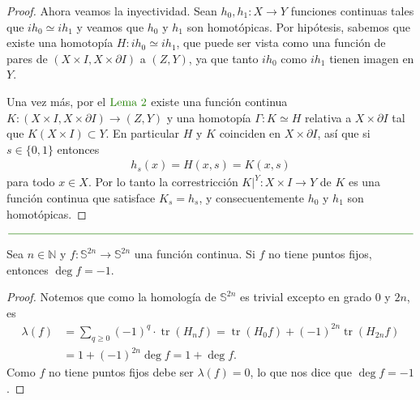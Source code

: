 \documentclass[11pt]{article}
\newcommand{\N}{\mathbb{N}}
\newcommand{\Ss}{\mathbb{S}}
\newcommand{\tr}{\operatorname{tr}}
\newcommand{\paint}[1]{\color{color}{#1}}
\newenvironment{lemma}[2][Lema]{\begin{trivlist}
\item[\hskip \labelsep \paint{{\bfseries #1}}\hskip \labelsep {\bfseries #2.}]}{\end{trivlist}}
\begin{document}
\begin{proof}
Ahora veamos la inyectividad. Sean $h_0,h_1 : X \to Y$ funciones continuas tales que $ih_0 \simeq ih_1$ y veamos que $h_0$ y $h_1$ son homotópicas. Por hipótesis, sabemos que existe una homotopía $H : ih_0 \simeq ih_1$, que puede ser vista como una función de pares de $(X \times I, X \times \partial I)$ a $(Z,Y)$, ya que tanto $ih_0$ como $ih_1$ tienen imagen en $Y$. 

Una vez más, por el $\paint{\text{Lema $2$}}$ existe una función continua $K : (X \times I, X \times \partial I) \to (Z,Y)$ y una homotopía $\Gamma : K \simeq H$ relativa a $X \times \partial I$ tal que $K(X \times I) \subset Y$. En particular $H$ y $K$ coinciden en $X \times \partial I$, así que si $s \in \{0,1\}$ entonces
\begin{align*}
h_s(x) = H(x,s) = K(x,s)
\end{align*}
para todo $x \in X$. Por lo tanto la correstricción $K|^Y : X \times I \to Y$ de $K$ es una función continua que satisface $K_s = h_s$, y consecuentemente $h_0$ y $h_1$ son homotópicas.
\end{proof}

\begin{center}
$\paint{
\rule{400pt}{0.5pt}
}$
\vspace{10pt}
\end{center}

\begin{lemma}{3} Sea $n \in \N$ y $f : \Ss^{2n} \to \Ss^{2n}$ una funci\'on continua. Si $f$ no tiene puntos fijos, entonces $\deg f = -1$.
\end{lemma}
\begin{proof} Notemos que como la homolog\'ia de $\Ss^{2n}$ es trivial excepto en grado $0$ y $2n$, es
\begin{align*}
\lambda(f) &= \sum_{q \geq 0}(-1)^q \cdot \tr(H_nf) = \tr(H_0f) + (-1)^{2n}\tr(H_{2n}f)\\
& = 1 + (-1)^{2n}\deg f = 1 + \deg f.
\end{align*}
Como $f$ no tiene puntos fijos debe ser $\lambda(f) = 0$, lo que nos dice que $\deg f = -1$. 
\end{proof}
\end{document}
